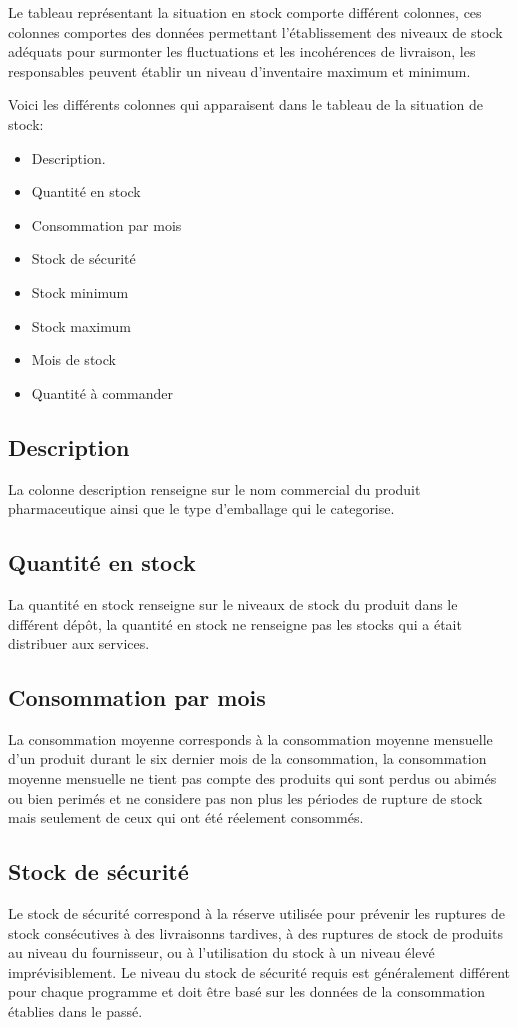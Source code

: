 \documentclass[12pt,a4paper]{report}
\begin{document}
Le tableau représentant la situation en stock comporte différent colonnes, ces colonnes comportes des données permettant l'établissement des niveaux de stock adéquats pour surmonter les fluctuations et les incohérences de livraison, les responsables peuvent établir un niveau d'inventaire maximum et minimum.

Voici les différents colonnes qui apparaisent dans le tableau de la situation de stock:
\begin{itemize}
\item Description. 
\item Quantité en stock
\item Consommation par mois
\item Stock de sécurité
\item Stock minimum
\item Stock maximum
\item Mois de stock
\item Quantité à commander
\end{itemize}

\subsection{Description}
La colonne description renseigne sur le nom commercial du produit pharmaceutique ainsi que le type d'emballage qui le categorise.

\subsection{Quantité en stock}
La quantité en stock renseigne sur le niveaux de stock du produit dans le différent dépôt, la quantité en stock ne renseigne pas les stocks qui a était distribuer aux services.

\subsection{Consommation par mois}
La consommation moyenne corresponds à la consommation moyenne mensuelle d'un produit durant le six dernier mois de la consommation, la consommation moyenne mensuelle ne tient pas compte des produits qui sont perdus ou abimés ou bien perimés et ne considere pas non plus les périodes de rupture de stock mais seulement de ceux qui ont été réelement consommés.

\subsection{Stock de sécurité}
Le stock de sécurité correspond à la réserve utilisée pour prévenir les ruptures de stock consécutives à des livraisonns tardives, à des ruptures de stock de produits au niveau du fournisseur, ou à l'utilisation du stock à un niveau élevé imprévisiblement. Le niveau du stock de sécurité requis est généralement différent pour chaque programme et doit être basé sur les données de la consommation établies dans le passé.
\end{document}
